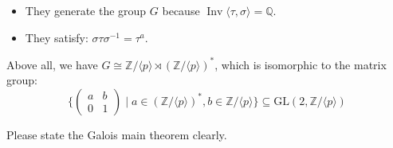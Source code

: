 \begin{solution}
\begin{itemize}
        \item They generate the group $G$ because $\operatorname{Inv}\langle \tau, \sigma \rangle=\mathbb{Q}$. 
        \item They satisfy: $\sigma\tau\sigma^{-1}=\tau^{a}$.
    \end{itemize}
    Above all, we have $G\cong\mathbb{Z}/\langle p \rangle \rtimes (\mathbb{Z}/\langle p\rangle)^\ast$, which is isomorphic to the matrix group: 
        \[
            \Biggl\{ 
            \begin{pmatrix} 
            a & b \\ 
            0 & 1 
            \end{pmatrix} 
            \mid 
            a \in (\mathbb{Z}/\langle p \rangle)^{\ast}, 
            b \in \mathbb{Z}/\langle p \rangle 
            \Biggr\} 
            \subseteq \mathrm{GL}(2, \mathbb{Z}/\langle p \rangle)
        \]
\end{solution}

\setcounter{pb}{27}
\begin{problem}
    Please state the Galois main theorem clearly.
\end{problem}